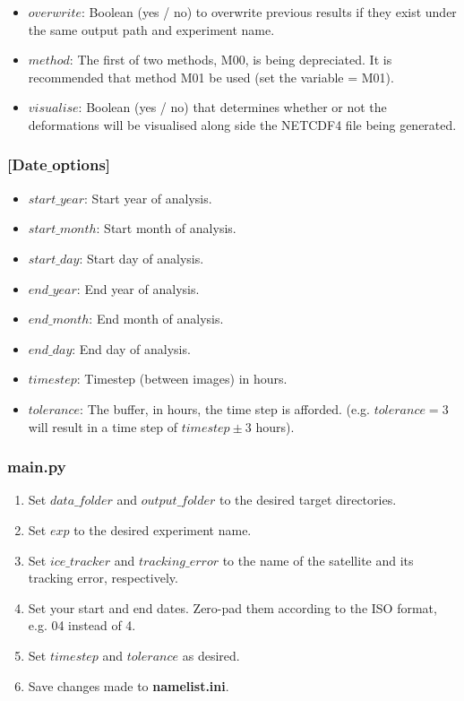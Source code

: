 \documentclass[12pt]{article}
\begin{document}
\begin{itemize}
    \item $overwrite$: Boolean (yes / no) to overwrite previous results if they exist under the same output path and experiment name.
    \item $method$: The first of two methods, M00, is being depreciated. It is recommended that method M01 be used (set the variable = M01).
    \item $visualise$: Boolean (yes / no) that determines whether or not the deformations will be visualised along side the NETCDF4 file being generated.
\end{itemize}

\subsubsection*{[Date$\_$options]}

\begin{itemize}
    \item $start\_year$: Start year of analysis. 
    \item $start\_month$: Start month of analysis.
    \item $start\_day$: Start day of analysis.
    \item $end\_year$: End year of analysis.
    \item $end\_month$: End month of analysis.
    \item $end\_day$: End day of analysis.
    \item $timestep$: Timestep (between images) in hours.
    \item $tolerance$: The buffer, in hours, the time step is afforded. (e.g. $tolerance = 3$ will result in a time step of $timestep \pm 3$ hours).
\end{itemize}

\subsubsection*{\textbf{main.py}}

\begin{enumerate}
    \item Set $data\_folder$ and $output\_folder$ to the desired target directories.
    \item Set $exp$ to the desired experiment name.
    \item Set $ice\_tracker$ and $tracking\_error$ to the name of the satellite and its tracking error, respectively.
    \item Set your start and end dates. Zero-pad them according to the ISO format, e.g. 04 instead of 4.
    \item Set $timestep$ and $tolerance$ as desired.
    \item Save changes made to \textbf{namelist.ini}.
\end{enumerate}
\end{document}
